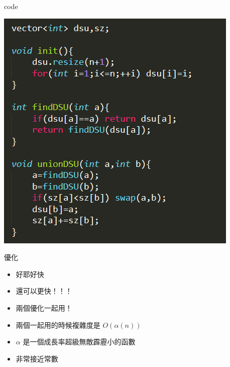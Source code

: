 \documentclass[aspectratio=169]{beamer}
\begin{document}
    \begin{frame}{code}
        \begin{center}
            \includegraphics[scale=0.6]{code/dsu_merge.png}
        \end{center}
    \end{frame}
    \begin{frame}{優化}
        \begin{itemize}
            \item 好耶好快
            \item 還可以更快！！！
            \item<2-> 兩個優化一起用！
            \item<3-> 兩個一起用的時候複雜度是 $O(\alpha(n))$
            \item<3-> $\alpha$ 是一個成長率超級無敵霹靂小的函數
            \item<3-> 非常接近常數
        \end{itemize}
    \end{frame}
\end{document}
